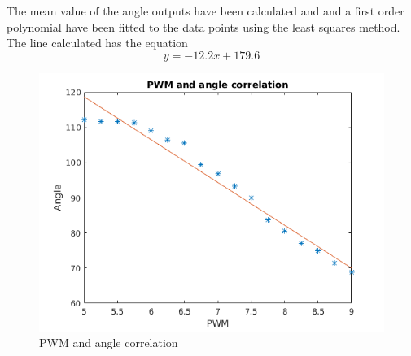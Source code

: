 The mean value of the angle outputs have been calculated and and a first order polynomial have been fitted to the data points using the least squares method. The line calculated has the equation $$ y=-12.2x + 179.6$$

\begin{figure}[H]
  \includegraphics[scale=0.9]{./img/PWMPLOT.png}
  \centering
  \caption{PWM and angle correlation}
  \label{fig:PWM and angle correlation}
\end{figure}

